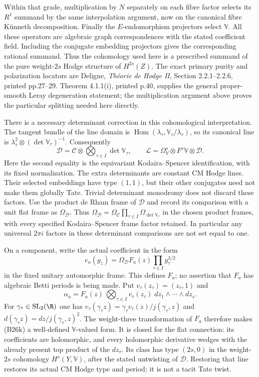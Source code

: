 Within that grade, multiplication by $N$ separately
on each fibre factor selects its $R^1$ summand by
the same interpolation argument, now on the
canonical fibre K\"unneth decomposition.  Finally
the $E$-endomorphism projectors select $\mathbb V$.
All these operators are algebraic graph
correspondences with the stated coefficient field.
Including the conjugate embedding projectors gives
the corresponding rational summand.  Thus the
cohomology used here is a prescribed summand of the
pure weight-$2s$ Hodge structure of $H^{2s}(Z)$.
The exact primary purity and polarization locators
are Deligne, \emph{Th\'eorie de Hodge II},
Section 2.2.1--2.2.6, printed pp.27--29.
Theorem 4.1.1(i), printed p.40, supplies the general
proper-smooth Leray degeneration statement; the
multiplication argument above proves the particular
splitting needed here directly.

There is a necessary determinant correction in this
cohomological interpretation.  The tangent bundle of the
line domain is $\operatorname{Hom}(\lambda_\tau,
\mathbb V_\tau/\lambda_\tau)$, so its canonical line is
$\lambda_\tau^2\otimes(\det\mathbb V_\tau)^{-1}$.
Consequently
\[
 \mathscr D=\mathscr C\otimes
                 \bigotimes_{\tau\in I}\det\mathbb V_\tau,
 \qquad
 \mathscr L=\Omega_Y^s\otimes F^s\mathbb V\otimes\mathscr D.
 \tag{B26i$'$}
\]
Here the second equality is the equivariant
Kodaira--Spencer identification, with its fixed
normalization.  The extra determinants are constant
CM Hodge lines.  Their selected embeddings have type
$(1,1)$, but their other conjugates need not make them
globally Tate.  Trivial determinant monodromy does not
discard these factors.  Use the product de Rham frame
of $\mathscr D$ and record its comparison with a unit
flat frame as $\Omega_{\mathscr D}$.  Thus
$\Omega_{\mathscr D}=\Omega_{\mathscr C}
\prod_{\tau\in I}\Omega_{\det\mathbb V_\tau}$ in the
chosen product frames, with every specified
Kodaira--Spencer frame factor retained.  In particular
any universal $2\pi i$ factors in these determinant
comparisons are not set equal to one.

On a component, write the actual coefficient in the form
\[
           e_a(g_z)=
              \Omega_{\mathscr D}F_a(z)
                          \prod_{\tau\in I}y_\tau^{3/2}
 \tag{B26j}
\]
in the fixed unitary automorphic frame.  This defines $F_a$;
no assertion that $F_a$ has algebraic Betti periods is being
made.  Put $v_\tau(z_\tau)=(z_\tau,1)$ and
\[
 \alpha_a=F_a(z)\,
       \bigotimes_{\tau\in I}v_\tau(z_\tau)
                   \;dz_1\wedge\cdots\wedge dz_s.
 \tag{B26k}
\]
For $\gamma_\tau\in\mathrm{SL}_2(\R)$ one has
$v_\tau(\gamma_\tau z)=
 \gamma_\tau v_\tau(z)/j(\gamma_\tau,z)$ and
$d(\gamma_\tau z)=dz/j(\gamma_\tau,z)^2$.
The weight-three transformation of $F_a$ therefore makes
(B26k) a well-defined $\mathbb V$-valued form.  It is closed
for the flat connection: its coefficients are holomorphic,
and every holomorphic derivative wedges with the already
present top product of the $dz_\tau$.
Its class has type $(2s,0)$ in the weight-$2s$ cohomology
$H^s(Y,\mathbb V)$, after the stated untwisting of
$\mathscr D$.  Restoring that line restores its actual CM
Hodge type and period; it is not a tacit Tate twist.

